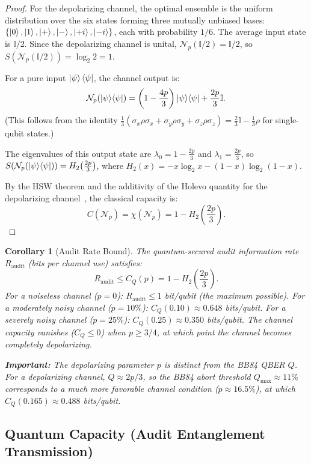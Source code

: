 \documentclass[11pt,a4paper]{article}
\theoremstyle{plain}
\newtheorem{corollary}[theorem]{Corollary}
\theoremstyle{definition}
\theoremstyle{remark}
\newcommand{\cN}{\mathcal{N}}
\newcommand{\id}{\mathbb{I}}
\newcommand{\ketbra}[2]{\ket{#1}\!\bra{#2}}
\newcommand{\pauliX}{\sigma_x}
\newcommand{\pauliY}{\sigma_y}
\newcommand{\pauliZ}{\sigma_z}
\begin{document}
\begin{proof}
For the depolarizing channel, the optimal ensemble is the uniform distribution
over the six states forming three mutually unbiased bases:
$\{\ket{0},\ket{1},\ket{+},\ket{-},\ket{+i},\ket{-i}\}$, each with probability
$1/6$. The average input state is $\id/2$. Since the depolarizing channel is
unital, $\cN_p(\id/2) = \id/2$, so $S(\cN_p(\id/2)) = \log_2 2 = 1$.

For a pure input $\ket{\psi}\bra{\psi}$, the channel output is:
\[
\cN_p(\ketbra{\psi}{\psi}) = \left(1 - \frac{4p}{3}\right)\ketbra{\psi}{\psi}
+ \frac{2p}{3}\id.
\]
(This follows from the identity
$\frac{1}{3}(\pauliX\rho\pauliX + \pauliY\rho\pauliY + \pauliZ\rho\pauliZ)
= \frac{2}{3}\id - \frac{1}{3}\rho$ for single-qubit states.)

The eigenvalues of this output state are
$\lambda_0 = 1 - \frac{2p}{3}$ and $\lambda_1 = \frac{2p}{3}$,
so $S(\cN_p(\ketbra{\psi}{\psi})) = H_2\!\left(\frac{2p}{3}\right)$,
where $H_2(x) = -x\log_2 x - (1-x)\log_2(1-x)$.

By the HSW theorem and the additivity of the Holevo quantity for the
depolarizing channel~\cite{king2003}, the classical capacity is:
\[
C(\cN_p) = \chi(\cN_p) = 1 - H_2\!\left(\frac{2p}{3}\right).
\]
\end{proof}

\begin{corollary}[Audit Rate Bound]
\label{cor:audit_rate}
The quantum-secured audit information rate $R_{\text{audit}}$ (bits per
channel use) satisfies:
\[
R_{\text{audit}} \leq C_Q(p) = 1 - H_2\!\left(\frac{2p}{3}\right).
\]
For a noiseless channel ($p=0$): $R_{\text{audit}} \leq 1$ bit/qubit
(the maximum possible). For a moderately noisy channel ($p=10\%$):
$C_Q(0.10) \approx 0.648$ bits/qubit. For a severely noisy channel
($p=25\%$): $C_Q(0.25) \approx 0.350$ bits/qubit. The channel capacity
vanishes ($C_Q \leq 0$) when $p \geq 3/4$, at which point the
channel becomes completely depolarizing.

\textbf{Important:} The depolarizing parameter $p$ is distinct from the
BB84 QBER $Q$. For a depolarizing channel, $Q \approx 2p/3$, so the
BB84 abort threshold $Q_{\max} \approx 11\%$ corresponds to a much
more favorable channel condition ($p \approx 16.5\%$), at which
$C_Q(0.165) \approx 0.488$ bits/qubit.
\end{corollary}

\subsection{Quantum Capacity (Audit Entanglement Transmission)}
\label{sec:quantum_capacity}
\end{document}
